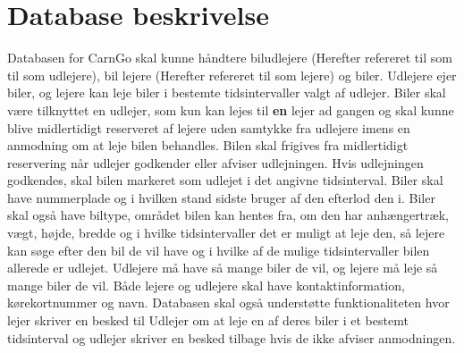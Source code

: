 \documentclass[Arkitektur/System_main.tex]{subfiles}
\begin{document}
\section{Database beskrivelse}
Databasen for CarnGo skal kunne håndtere biludlejere (Herefter refereret til som til som udlejere), bil lejere (Herefter refereret til som lejere) og biler.
Udlejere ejer biler, og lejere kan leje biler i bestemte tidsintervaller valgt af udlejer.
Biler skal være tilknyttet en udlejer, som kun kan lejes til \textbf{en} lejer ad gangen og skal kunne blive midlertidigt reserveret af lejere uden samtykke fra udlejere imens en anmodning om at leje bilen behandles. Bilen skal frigives fra midlertidigt reservering når udlejer godkender eller afviser udlejningen. Hvis udlejningen godkendes, skal bilen markeret som udlejet i det angivne tidsinterval. Biler skal have nummerplade og i hvilken stand sidste bruger af den efterlod den i. Biler skal også have biltype, området bilen kan hentes fra, om den har anhængertræk, vægt, højde, bredde og i hvilke tidsintervaller det er muligt at leje den, så lejere kan søge efter den bil de vil have og i hvilke af de mulige tidsintervaller bilen allerede er udlejet.
Udlejere må have så mange biler de vil, og lejere må leje så mange biler de vil. Både lejere og udlejere skal have kontaktinformation, kørekortnummer og navn.
Databasen skal også understøtte funktionaliteten hvor lejer skriver en besked til Udlejer om at leje en af deres biler i et bestemt tidsinterval og udlejer skriver en besked tilbage hvis de ikke afviser anmodningen.
\end{document}
